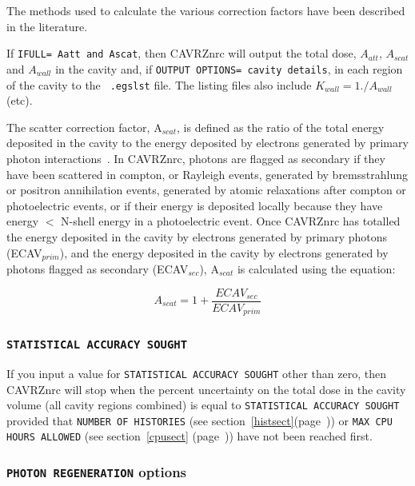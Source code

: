 \documentclass[12pt,twoside]{article}  %
\newcommand{\lpage}[1]{(page~\pageref{#1})}
\newcommand{\note}[1]{\mbox{}\\ \noindent \rule{16cm}{0.5mm} \\
{\em #1} \\ \noindent \rule{16cm}{0.5mm}\\
\typeout{******note: #1 *****}
}
\begin{document}
The methods used to calculate the various correction factors have been
described in the literature\cite{Bi85,Ro85a,Bi86,RB90a}.

If {\tt IFULL= Aatt and Ascat}, then CAVRZnrc will output the total dose,
$A_{att}$, $A_{scat}$ and $A_{wall}$ in the cavity and, if {\tt OUTPUT
OPTIONS= cavity details}, in each region of the cavity to the {\tt
.egslst} file. The listing files also include $K_{wall} = 1./A_{wall}$
(etc).

The scatter correction factor, A$_{scat}$, is defined as the ratio of the
total energy deposited in the cavity to the energy deposited by electrons
generated by primary photon interactions~\cite{Bi86}.  In CAVRZnrc,
photons are flagged as secondary if they have been scattered in compton,
or Rayleigh events, generated by bremsstrahlung or positron annihilation
events, generated by atomic relaxations after compton or photoelectric
events, or if their energy is deposited locally because they have
energy $<$ N-shell energy in a photoelectric event.  Once CAVRZnrc has
totalled the energy deposited in the cavity by electrons generated by
primary photons (ECAV$_{prim}$), and the energy deposited in the cavity
by electrons generated by photons flagged as secondary (ECAV$_{sec}$),
A$_{scat}$ is calculated using the equation:

\begin{equation}
A_{scat}=1+\frac{ECAV_{sec}}{ECAV_{prim}}
\end{equation}

\subsubsection{{\tt STATISTICAL ACCURACY SOUGHT}}

If you input a value for {\tt STATISTICAL ACCURACY SOUGHT}
other than zero, then CAVRZnrc will stop when the percent uncertainty on the
total dose in the cavity volume (all cavity regions combined) is equal
to {\tt STATISTICAL ACCURACY SOUGHT} provided that
{\tt NUMBER OF HISTORIES} (see section~\ref{histsect}\lpage{histsect})
or {\tt MAX CPU HOURS ALLOWED} (see section~\ref{cpusect} \lpage{cpusect}) have
not been reached first.

\subsubsection{{\tt PHOTON REGENERATION} options}
\end{document}
